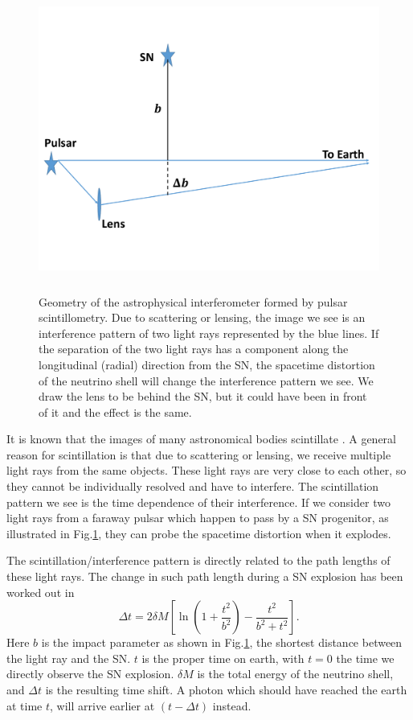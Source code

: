 \documentclass[aps,showpacs,onecolumn,floats,prd,superscriptaddress,nofootinbib]{revtex4-1}
\begin{document}
\begin{figure}[t!]
\begin{center}
\includegraphics[width=\textwidth,height=10cm]{Lens.pdf}
\caption{Geometry of the astrophysical interferometer formed by pulsar scintillometry. Due to scattering or lensing, the image we see is an interference pattern of two light rays represented by the blue lines. If the separation of the two light rays has a component along the longitudinal (radial) direction from the SN, the spacetime distortion of the neutrino shell will change the interference pattern we see. We draw the lens to be behind the SN, but it could have been in front of it and the effect is the same.}
\label{fig:4}
\end{center}
\end{figure}

It is known that the images of many astronomical bodies scintillate \cite{PulsarScint}. A general reason for scintillation is that due to scattering or lensing, we receive multiple light rays from the same objects. These light rays are very close to each other, so they cannot be individually resolved and have to interfere. The scintillation pattern we see is the time dependence of their interference. If we consider two light rays from a faraway pulsar which happen to pass by a SN progenitor, as illustrated in Fig.\ref{fig:4}, they can probe the spacetime distortion when it explodes. 

The scintillation/interference pattern is directly related to the path lengths of these light rays. The change in such path length during a SN explosion has been worked out in \cite{Olum:2013gza}
\begin{equation}
	\Delta t = 2\delta M \left[ \ln \left(1 + \frac{t^2}{b^2} \right) - \frac{t^2}{b^2 + t^2} \right].
\end{equation}
Here $b$ is the impact parameter as shown in Fig.\ref{fig:4}, the shortest distance between the light ray and the SN. $t$ is the proper time on earth, with $t=0$ the time we directly observe the SN explosion. $\delta M$ is the total energy of the neutrino shell, and $\Delta t$ is the resulting time shift. A photon which should have reached the earth at time $t$, will arrive earlier at $(t-\Delta t)$ instead.
\end{document}
